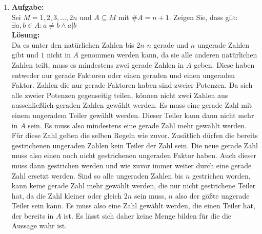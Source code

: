 \documentclass[11pt, a4paper]{article}
\begin{document}
\begin{enumerate}
\begin{enumerate}[(a)]
    \end{enumerate}
    \item {\bfseries Aufgabe:\\}
    Sei $M = {1, 2, 3, \dots, 2n}$ und $A \subseteq M$ mit $\#A = n + 1$. Zeigen Sie, dass gilt:\\
    $\exists a, b \in A: a \neq b \land a|b$\\
    {\bfseries Lösung:\\}
    Da es unter den natürlichen Zahlen bis $2n$ $n$ gerade und $n$ ungerade Zahlen gibt und $1$ nicht in $A$ genommen werden kann, da sie alle anderen
    natürlichen Zahlen teilt, muss es mindestens zwei gerade Zahlen in $A$ geben. Diese haben entweder nur gerade Faktoren oder einen geraden und einen
    ungeraden Faktor. Zahlen die nur gerade Faktoren haben sind zweier Potenzen. Da sich alle zweier Potenzen gegenseitig teilen, können nicht zwei Zahlen
    aus ausschließlich geraden Zahlen gewählt werden. Es muss eine gerade Zahl mit einem ungeradem Teiler gewählt werden. Dieser Teiler kann dann nicht mehr
    in $A$ sein. Es muss also mindestens eine gerade Zahl mehr gewählt werden. Für diese Zahl gelten die selben Regeln wie zuvor. Zusätlich dürfen die
    bereits gestrichenen ungeraden Zahlen kein Teiler der Zahl sein. Die neue gerade Zahl muss also einen noch nicht gestrichenen ungeraden Faktor haben.
    Auch dieser muss dann gestrichen werden und wie zuvor immer weiter durch eine gerade Zahl ersetzt werden. Sind so alle ungeraden Zahlen bis $n$ gestrichen
    worden, kann keine gerade Zahl mehr gewählt werden, die nur nicht gestrichene Teiler hat, da die Zahl kleiner oder gleich $2n$ sein muss, $n$ also der gößte
    ungerade Teiler sein kann. Es muss also eine Zahl gewählt werden, die einen Teiler hat, der bereits in $A$ ist. Es lässt sich daher keine Menge bilden
    für die die Aussage wahr ist. 
\end{enumerate}
\end{document}

